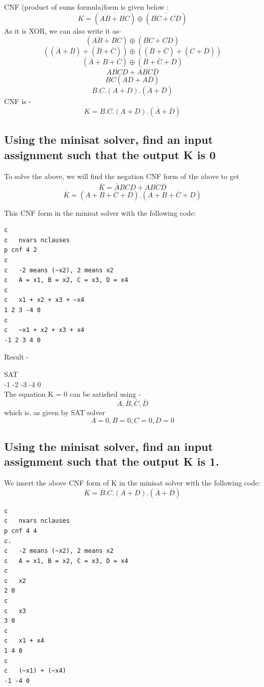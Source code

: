 \documentclass[12pt]{article}
\begin{document}
CNF (product of sums formula)form is given below :\\
\[K = (\overline{\overline{AB}+\overline{BC}})\oplus(\overline{\overline{BC}+\overline{CD}})\]
As it is XOR, we can also write it as-
\[(\overline{AB}+\overline{BC})\oplus(\overline{BC}+\overline{CD})\]
\[((\overline{A}+\overline{B})+(\overline{B}+\overline{C}))\oplus((\overline{B}+\overline{C})+(\overline{C}+\overline{D}))\]
\[(\overline{A}+\overline{B}+\overline{C}) \oplus (\overline{B}+\overline{C}+\overline{D})\]
\[\overline{A}BCD + ABC\overline{D}\]
\[BC(\overline{A}D+A\overline{D})\]
\[B.C.(A+D).(\overline{A} + \overline{D})\]
CNF is - 
\[K = B.C.(A + D).(\overline{A} + \overline{D})\]

\subsection{Using the minisat solver, find an input assignment such that the
output K is 0}
To solve the above, we will find the negation CNF form of the above to get 
\[\overline{K} = \overline{\overline{A}BCD + ABC\overline{D}}\]
\[\overline{K} = (A+\overline{B}+\overline{C}+\overline{D}).(\overline{A}+\overline{B}+\overline{C}+D)\]

This CNF form in the minisat solver with the following code:
\begin{verbatim}
c
c   nvars nclauses
p cnf 4 2
c
c   -2 means (~x2), 2 means x2
c   A = x1, B = x2, C = x3, D = x4
c
c   x1 + x2 + x3 + ~x4
1 2 3 -4 0
c
c   ~x1 + x2 + x3 + x4
-1 2 3 4 0
\end{verbatim}

Result - 

SAT\\
-1 -2 -3 -4 0\\

The equation K = 0 can be satisfied using -
\[\overline{A},\overline{B},\overline{C},\overline{D}\]
which is, as given by SAT solver
\[A = 0, B = 0, C = 0, D = 0\]

\subsection{Using the minisat solver, find an input assignment such that the
output K is 1.}
We insert the above CNF form of K in the minisat solver with the following code:
\[K = B.C.(A + D).(\overline{A} + \overline{D})\]
\begin{verbatim}
c
c   nvars nclauses
p cnf 4 4
c.
c   -2 means (~x2), 2 means x2
c   A = x1, B = x2, C = x3, D = x4
c
c   x2
2 0
c
c   x3
3 0
c
c   x1 + x4
1 4 0
c
c   (~x1) + (~x4)
-1 -4 0
\end{verbatim}
\end{document}
